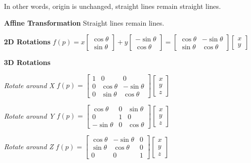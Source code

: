 \documentclass[letterpaper, 8pt]{extarticle}
\begin{document}
\begin{multicols*}{4}
In other words, origin is unchanged, straight lines remain straight lines.

\textbf{Affine Transformation}
Straight lines remain lines.

\textbf{2D Rotations}
\(
f(p)
= x \begin{bmatrix}
    \cos \theta \\ \sin \theta
\end{bmatrix}
+ y \begin{bmatrix}
    -\sin \theta \\ \cos \theta
\end{bmatrix}
= \begin{bmatrix}
    \cos \theta & - \sin \theta \\
    \sin \theta & \cos \theta
\end{bmatrix}
\begin{bmatrix}
    x \\ y
\end{bmatrix}
\)

\textbf{3D Rotations}

\textit{Rotate around X}
\(
f(p) = \begin{bmatrix}
    1 & 0           & 0            \\
    0 & \cos \theta & -\sin \theta \\
    0 & \sin \theta & \cos \theta
\end{bmatrix}
\begin{bmatrix}
    x \\ y \\ z
\end{bmatrix}
\)

\textit{Rotate around Y}
\(
f(p) = \begin{bmatrix}
    \cos \theta  & 0 & \sin \theta \\
    0            & 1 & 0           \\
    -\sin \theta & 0 & \cos \theta
\end{bmatrix}
\begin{bmatrix}
    x \\ y \\ z
\end{bmatrix}
\)

\textit{Rotate around Z}
\(
f(p) = \begin{bmatrix}
    \cos \theta & -\sin \theta & 0 \\
    \sin \theta & \cos \theta  & 0 \\
    0           & 0            & 1
\end{bmatrix}
\begin{bmatrix}
    x \\ y \\ z
\end{bmatrix}
\)


\end{multicols*}
\end{document}

